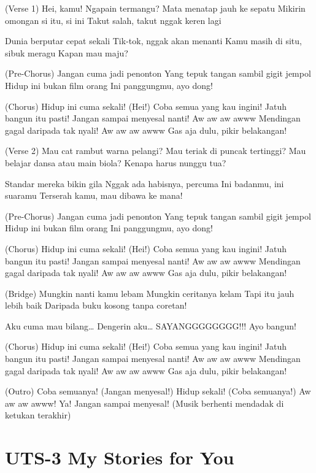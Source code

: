 \documentclass[
  letterpaper,
  DIV=11,
  numbers=noendperiod]{scrreprt}
\begin{document}
(Verse 1) Hei, kamu! Ngapain termangu? Mata menatap jauh ke sepatu
Mikirin omongan si itu, si ini Takut salah, takut nggak keren lagi

Dunia berputar cepat sekali Tik-tok, nggak akan menanti Kamu masih di
situ, sibuk meragu Kapan mau maju?

(Pre-Chorus) Jangan cuma jadi penonton Yang tepuk tangan sambil gigit
jempol Hidup ini bukan film orang Ini panggungmu, ayo dong!

(Chorus) Hidup ini cuma sekali! (Hei!) Coba semua yang kau ingini! Jatuh
bangun itu pasti! Jangan sampai menyesal nanti! Aw aw aw awww Mendingan
gagal daripada tak nyali! Aw aw aw awww Gas aja dulu, pikir belakangan!

(Verse 2) Mau cat rambut warna pelangi? Mau teriak di puncak tertinggi?
Mau belajar dansa atau main biola? Kenapa harus nunggu tua?

Standar mereka bikin gila Nggak ada habisnya, percuma Ini badanmu, ini
suaramu Terserah kamu, mau dibawa ke mana!

(Pre-Chorus) Jangan cuma jadi penonton Yang tepuk tangan sambil gigit
jempol Hidup ini bukan film orang Ini panggungmu, ayo dong!

(Chorus) Hidup ini cuma sekali! (Hei!) Coba semua yang kau ingini! Jatuh
bangun itu pasti! Jangan sampai menyesal nanti! Aw aw aw awww Mendingan
gagal daripada tak nyali! Aw aw aw awww Gas aja dulu, pikir belakangan!

(Bridge) Mungkin nanti kamu lebam Mungkin ceritanya kelam Tapi itu jauh
lebih baik Daripada buku kosong tanpa coretan!

Aku cuma mau bilang\ldots{} Dengerin aku\ldots{} SAYANGGGGGGGG!!! Ayo
bangun!

(Chorus) Hidup ini cuma sekali! (Hei!) Coba semua yang kau ingini! Jatuh
bangun itu pasti! Jangan sampai menyesal nanti! Aw aw aw awww Mendingan
gagal daripada tak nyali! Aw aw aw awww Gas aja dulu, pikir belakangan!

(Outro) Coba semuanya! (Jangan menyesal!) Hidup sekali! (Coba semuanya!)
Aw aw aw awww! Ya! Jangan sampai menyesal! (Musik berhenti mendadak di
ketukan terakhir)


\chapter{UTS-3 My Stories for You}\label{uts-3-my-stories-for-you}
\end{document}

